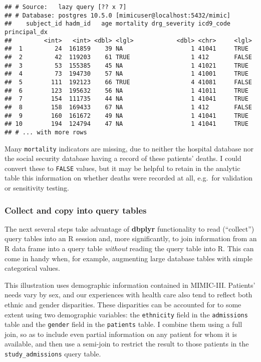 \documentclass[]{article}
\begin{document}
\begin{verbatim}
## # Source:   lazy query [?? x 7]
## # Database: postgres 10.5.0 [mimicuser@localhost:5432/mimic]
##    subject_id hadm_id   age mortality drg_severity icd9_code principal_dx
##         <int>   <int> <dbl> <lgl>            <dbl> <chr>     <lgl>       
##  1         24  161859    39 NA                   1 41041     TRUE        
##  2         42  119203    61 TRUE                 1 412       FALSE       
##  3         53  155385    45 NA                   1 41021     TRUE        
##  4         73  194730    57 NA                   1 41001     TRUE        
##  5        111  192123    66 TRUE                 4 41081     FALSE       
##  6        123  195632    56 NA                   1 41011     TRUE        
##  7        154  111735    44 NA                   1 41041     TRUE        
##  8        158  169433    67 NA                   1 412       FALSE       
##  9        160  161672    49 NA                   1 41041     TRUE        
## 10        194  124794    47 NA                   1 41041     TRUE        
## # ... with more rows
\end{verbatim}

Many \texttt{mortality} indicators are missing, due to neither the
hospital database nor the social security database having a record of
these patients' deaths. I could convert these to \texttt{FALSE} values,
but it may be helpful to retain in the analytic table this information
on whether deaths were recorded at all, e.g.~for validation or
sensitivity testing.

\subsubsection{Collect and copy into query
tables}\label{collect-and-copy-into-query-tables}

The next several steps take advantage of \textbf{dbplyr} functionality
to read (``collect'') query tables into an R session and, more
significantly, to join information from an R data frame into a query
table \emph{without} reading the query table into R. This can come in
handy when, for example, augmenting large database tables with simple
categorical values.

This illustration uses demographic information contained in MIMIC-III.
Patients' needs vary by sex, and our experiences with health care also
tend to reflect both ethnic and gender disparities. These disparities
can be accounted for to some extent using two demographic variables: the
\texttt{ethnicity} field in the \texttt{admissions} table and the
\texttt{gender} field in the \texttt{patients} table. I combine them
using a full join, so as to include even partial information on any
patient for whom it is available, and then use a semi-join to restrict
the result to those patients in the \texttt{study\_admissions} query
table.
\end{document}

